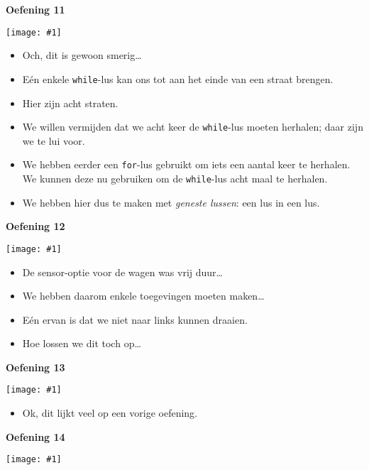 \documentclass[a4paper]{article}
\newcommand{\newexercise}[1]{\clearpage\begin{center}\Huge\bf #1\end{center}}
\newcommand{\exercisemap}[1]{\begin{center}\texttt{[image: \#1]}\end{center}}
\begin{document}
\newexercise{Oefening 11}
\exercisemap{ex11}

\begin{itemize}
  \item Och, dit is gewoon smerig\dots
  \item E\'en enkele \verb'while'-lus kan ons tot aan het einde van een straat brengen.
  \item Hier zijn acht straten.
  \item We willen vermijden dat we acht keer de \verb'while'-lus moeten herhalen; daar zijn we te lui voor.
  \item We hebben eerder een \verb'for'-lus gebruikt om iets een aantal keer te herhalen.
        We kunnen deze nu gebruiken om de \verb'while'-lus acht maal te herhalen.
  \item We hebben hier dus te maken met \emph{geneste lussen}: een lus in een lus.
\end{itemize}


\newexercise{Oefening 12}
\exercisemap{ex12}

\begin{itemize}
  \item De sensor-optie voor de wagen was vrij duur\dots
  \item We hebben daarom enkele toegevingen moeten maken\dots
  \item E\'en ervan is dat we niet naar links kunnen draaien.
  \item Hoe lossen we dit toch op\dots
\end{itemize}


\newexercise{Oefening 13}
\exercisemap{ex13}

\begin{itemize}
  \item Ok, dit lijkt veel op een vorige oefening.
\end{itemize}


\newexercise{Oefening 14}
\exercisemap{ex14}
\end{document}
